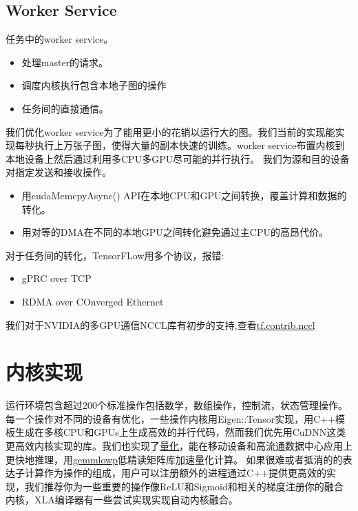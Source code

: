 \subsection{Worker Service}
任务中的worker service。
\begin{itemize}
\item 处理master的请求。
\item 调度内核执行包含本地子图的操作
\item 任务间的直接通信。
\end{itemize}
我们优化worker service为了能用更小的花销以运行大的图。我们当前的实现能实现每秒执行上万张子图，使得大量的副本快速的训练。worker service布置内核到本地设备上然后通过利用多CPU多GPU尽可能的并行执行。
我们为源和目的设备对指定发送和接收操作。
\begin{itemize}
\item 用cudaMemcpyAsync() API在本地CPU和GPU之间转换，覆盖计算和数据的转化。
\item 用对等的DMA在不同的本地GPU之间转化避免通过主CPU的高昂代价。
\end{itemize}
对于任务间的转化，TensorFLow用多个协议，报错:
\begin{itemize}
\item gPRC over TCP
\item RDMA over COnverged Ethernet
\end{itemize}
我们对于NVIDIA的多GPU通信NCCL库有初步的支持,查看\href{https://www.github.com/tensorflow/tensorflow/blob/r1.4/tensorflow/contrib/nccl/python/ops/nccl_ops.py}{tf.contrib.nccl}
\section{内核实现}
运行环境包含超过200个标准操作包括数学，数组操作，控制流，状态管理操作。每一个操作对不同的设备有优化，一些操作内核用Eigen::Tensor实现，用C++模板生成在多核CPU和GPUs上生成高效的并行代码，然而我们优先用CuDNN这类更高效内核实现的库。我们也实现了\href{https://www.tensorflow.org/performance/quantization}{量化}，能在移动设备和高流通数据中心应用上更快地推理，用\href{https://github.com/google/gemmlowp}{gemmlowp}低精读矩阵库加速量化计算。
如果很难或者抵消的的表达子计算作为操作的组成，用户可以注册额外的进程通过C++提供更高效的实现，我们推荐你为一些重要的操作像ReLU和Sigmoid和相关的梯度注册你的融合内核，XLA编译器有一些尝试实现实现自动内核融合。
